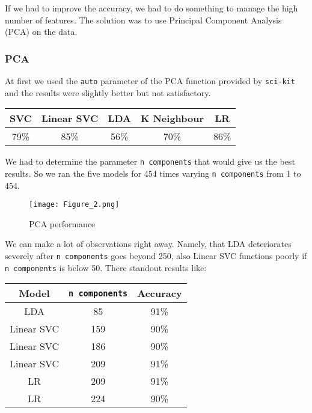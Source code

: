 \documentclass{article}
\begin{document}
If we had to improve the accuracy, we had to do something to manage the high number of features. The solution was to use Principal Component Analysis (PCA) on the data.

\subsubsection{PCA}

At first we used the \texttt{auto} parameter of the PCA function provided by \texttt{sci-kit} and the results were slightly better but not satisfactory. 

\begin{center}
 \begin{tabular}{|c | c | c | c | c |} 
 \hline
 SVC & Linear SVC & LDA & K Neighbour & LR \\
 \hline
79\% & 85\% & 56\% & 70\% & 86\% \\ 
 \hline
\end{tabular}
\end{center}

We had to determine the parameter \texttt{n components} that would give us the best results. So we ran the five models for 454 times varying \texttt{n components} from 1 to 454. 

\begin{center}
\begin{figure}[H]
\centering
\texttt{[image: Figure\_2.png]}
\caption{PCA performance}
\label{fig:pca}
\end{figure}
\end{center}

We can make a lot of observations right away. Namely, that LDA deteriorates severely after \texttt{n components} goes beyond 250, also Linear SVC functions poorly if \texttt{n components} is below 50.
\newline
There standout results like:

\begin{center}
 \begin{tabular}{|c | c | c |} 
 \hline
 \textbf{Model} & \textbf{\texttt{n components}} & \textbf{Accuracy}\\
 \hline
LDA & 85 & 91\%  \\ 
 \hline
 Linear SVC & 159 & 90\%  \\ 
 \hline
  Linear SVC & 186 & 90\%  \\ 
 \hline
  Linear SVC & 209 & 91\%  \\ 
 \hline
 LR & 209 & 91\%  \\ 
 \hline
 LR & 224 & 90\%  \\ 
 \hline
\end{tabular}
\end{center}





\end{document}
